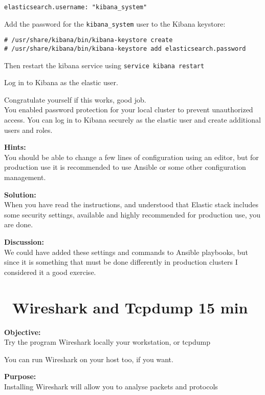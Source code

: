 \documentclass[a4paper,11pt,notitlepage]{report}
\begin{document}
\begin{verbatim}
elasticsearch.username: "kibana_system"
\end{verbatim}




Add the password for the \verb+kibana_system+ user to the Kibana keystore:
\begin{verbatim}
# /usr/share/kibana/bin/kibana-keystore create
# /usr/share/kibana/bin/kibana-keystore add elasticsearch.password
\end{verbatim}
Then restart the kibana service using \verb+service kibana restart+

Log in to Kibana as the elastic user.


Congratulate yourself if this works, good job.\\
You enabled password protection for your local cluster to prevent unauthorized access. You can log in to Kibana securely as the elastic user and create additional users and roles.


{\bf Hints:}\\
You should be able to change a few lines of configuration using an editor, but for production use it is recommended to use Ansible or some other configuration management.

{\bf Solution:}\\
When you have read the instructions, and understood that Elastic stack includes some security settings, available and highly recommended for production use, you are done.

{\bf Discussion:}\\
We could have added these settings and commands to Ansible playbooks, but since it is something that must be done differently in production clusters I considered it a good exercise.


\chapter{\faExclamationTriangle\ Wireshark and Tcpdump 15 min}
\label{ex:wireshark-install}



{\bf Objective:}\\
Try the program Wireshark locally your workstation, or tcpdump

You can run Wireshark on your host too, if you want.

{\bf Purpose:}\\
Installing Wireshark will allow you to analyse packets and protocols
\end{document}
